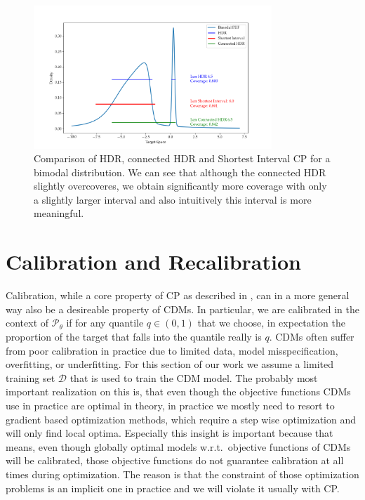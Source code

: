 \begin{figure}
    \centering
    \includegraphics[width=0.8\textwidth]{resources/bimodal_distribution_hdr_vs_shortest_interval.png}
    \caption[Comparison of HDR, connected HDR and Shortest Interval CP]{Comparison of HDR, connected HDR and Shortest Interval CP for a bimodal distribution. We can see that although the connected HDR slightly overcoveres, we obtain significantly more coverage with only a slightly larger interval and also intuitively this interval is more meaningful.}\label{fig:hdr_vs_shortest_intervals}
\end{figure}

\section{Calibration and Recalibration}\label{sec:calibration}

Calibration, while a core property of CP as described in , can in a more general way also be a desireable property of CDMs. In particular, we are calibrated in the context of $\mathscr{P}_\theta$ if for any quantile $q\in(0,1)$ that we choose, in expectation the proportion of the target that falls into the quantile really is $q$. CDMs often suffer from poor calibration in practice due to limited data, model misspecification, overfitting, or underfitting. For this section of our work we assume a limited training set $\mathcal{D}$ that is used to train the CDM model. The probably most important realization on this is, that even though the objective functions CDMs use in practice are optimal in theory, in practice we mostly need to resort to gradient based optimization methods, which require a step wise optimization and will only find local optima. Especially this insight is important because that means, even though globally optimal models w.r.t.\ objective functions of CDMs will be calibrated, those objective functions do not guarantee calibration at all times during optimization. The reason is that the constraint of those optimization problems is an implicit one in practice and we will violate it usually with CP.\@

